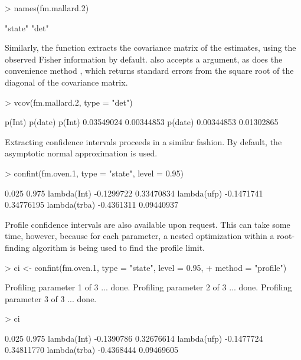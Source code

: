 \documentclass[article,shortnames]{jss}
\begin{document}
{\begin{Schunk}
\begin{Sinput}
> names(fm.mallard.2)
\end{Sinput}
\begin{Soutput}
[1] "state" "det"  
\end{Soutput}
\end{Schunk}

Similarly, the  function extracts the covariance matrix of
the estimates, using the observed Fisher information by default.  
also accepts a  argument, as does the convenience method 
, which returns standard errors from the square root of the diagonal 
of the covariance matrix. 

\begin{Schunk}
\begin{Sinput}
> vcov(fm.mallard.2, type = "det")
\end{Sinput}
\begin{Soutput}
            p(Int)    p(date)
p(Int)  0.03549024 0.00344853
p(date) 0.00344853 0.01302865
\end{Soutput}
\end{Schunk}

Extracting confidence intervals proceeds in a similar 
fashion.  By default, the asymptotic normal approximation is used.

\begin{Schunk}
\begin{Sinput}
> confint(fm.oven.1, type = "state", level = 0.95)
\end{Sinput}
\begin{Soutput}
                  0.025      0.975
lambda(Int)  -0.1299722 0.33470834
lambda(ufp)  -0.1471741 0.34776195
lambda(trba) -0.4361311 0.09440937
\end{Soutput}
\end{Schunk}

Profile confidence intervals are also available upon request.  This
can take some time, however, because for each parameter, a nested
optimization within a root-finding algorithm is being used to find the
profile limit.

\begin{Schunk}
\begin{Sinput}
> ci <- confint(fm.oven.1, type = "state", level = 0.95, 
+     method = "profile")
\end{Sinput}
\begin{Soutput}
Profiling parameter 1 of 3 ... done.
Profiling parameter 2 of 3 ... done.
Profiling parameter 3 of 3 ... done.
\end{Soutput}
\end{Schunk}
\begin{Schunk}
\begin{Sinput}
> ci
\end{Sinput}
\begin{Soutput}
                  0.025      0.975
lambda(Int)  -0.1390786 0.32676614
lambda(ufp)  -0.1477724 0.34811770
lambda(trba) -0.4368444 0.09469605
\end{Soutput}
\end{Schunk}

}
\end{document}

